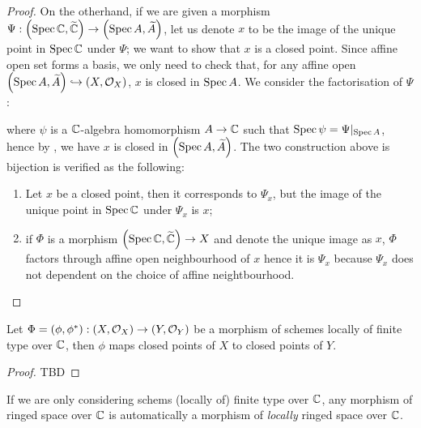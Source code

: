 \begin{proof}
  On the otherhand, if we are given a morphism $\Psi : \left(\operatorname*{Spec}{\mathbb{C}}, \widetilde{\mathbb{C}}\right) \to \left(\operatorname*{Spec}{A}, \widetilde{A}\right)$, let us denote $x$ to be the image of the unique point in $\operatorname{Spec} \mathbb{C}$ under $\Psi$; we want to show that $x$ is a closed point. Since affine open set forms a basis, we only need to check that, for any affine open $\left(\operatorname*{Spec}{A}, \widetilde{A}\right) \hookrightarrow \left(X, \mathcal{O}_{X}\right)$, $x$ is closed in $\operatorname{Spec} A$. We consider the factorisation of $\Psi$:
  \begin{center}
  \end{center}
  where $\psi$ is a $\mathbb{C}$-algebra homomorphism $A \to \mathbb{C}$ such that $\operatorname{Spec}{\psi} = \Psi|_{\operatorname{Spec} A}$, hence by , we have $x$ is closed in $\left(\operatorname*{Spec}{A}, \widetilde{A}\right)$.
  The two construction above is bijection is verified as the following:
  \begin{enumerate}
    \item Let $x$ be a closed point, then it corresponds to $\Psi_{x}$, but the image of the unique point in $\operatorname{Spec} \mathbb{C}$ under $\Psi_{x}$ is $x$;
    \item if $\Phi$ is a morphism $\left(\operatorname*{Spec}{\mathbb{C}}, \widetilde{\mathbb{C}}\right) \to X$ and denote the unique image as $x$,
          $\Phi$ factors through affine open neighbourhood of $x$ hence it is $\Psi_{x}$ because $\Psi_{x}$ does not dependent on the choice of affine neightbourhood.
  \end{enumerate}
\end{proof}

\begin{proposition}
  Let $\Phi = (\phi, \phi^{*}) : \left(X, \mathcal{O}_{X}\right) \to \left(Y, \mathcal{O}_{Y}\right)$ be a morphism of schemes locally of finite type over $\mathbb{C}$, then $\phi$ maps closed points of $X$ to closed points of $Y$.
  \label{thm:morph-maps-closed-points-to-closed-points}
\end{proposition}

\begin{proof}
  TBD
\end{proof}


\begin{remark}
  If we are only considering schems (locally of) finite type over $\mathbb{C}$, any morphism of ringed space over $\mathbb{C}$ is automatically a morphism of {\em locally\/} ringed space over $\mathbb{C}$.
\end{remark}

